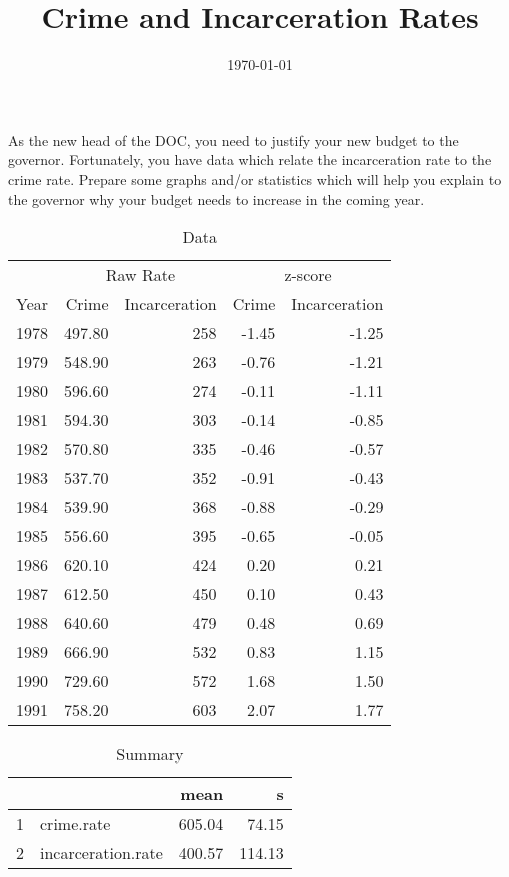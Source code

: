 \documentclass{exam}
\author{}
\title{Crime and Incarceration Rates}
\date{\today}
\begin{document}
  \maketitle

  As the new head of the DOC, you need to justify your new budget to the
  governor.  Fortunately, you have data which relate the incarceration rate to
  the crime rate.  Prepare some graphs and/or statistics which will help you
  explain to the governor why your budget needs to increase in the coming year.

  \begin{table}[H]
    \centering
    \begin{tabular}{rrrrr}
      \toprule
      & \multicolumn{2}{c}{Raw Rate} & \multicolumn{2}{c}{z-score } \\
      \cmidrule(r){2-3} \cmidrule(r){4-5} 
      Year & Crime  & Incarceration & Crime & Incarceration \\
      \midrule
      1978 & 497.80 & 258           & -1.45 & -1.25 \\
      1979 & 548.90 & 263           & -0.76 & -1.21 \\
      1980 & 596.60 & 274           & -0.11 & -1.11 \\
      1981 & 594.30 & 303           & -0.14 & -0.85 \\
      1982 & 570.80 & 335           & -0.46 & -0.57 \\
      1983 & 537.70 & 352           & -0.91 & -0.43 \\
      1984 & 539.90 & 368           & -0.88 & -0.29 \\
      1985 & 556.60 & 395           & -0.65 & -0.05 \\
      1986 & 620.10 & 424           & 0.20  & 0.21 \\
      1987 & 612.50 & 450           & 0.10  & 0.43 \\
      1988 & 640.60 & 479           & 0.48  & 0.69 \\
      1989 & 666.90 & 532           & 0.83  & 1.15 \\
      1990 & 729.60 & 572           & 1.68  & 1.50 \\
      1991 & 758.20 & 603           & 2.07  & 1.77 \\
      \bottomrule
    \end{tabular}
    \caption{Data}
  \end{table}

  \begin{table}[ht]
    \centering
    \begin{tabular}{rlrr}
      \toprule
        &                    & mean   & s \\
      \midrule
      1 & crime.rate         & 605.04 & 74.15 \\
      2 & incarceration.rate & 400.57 & 114.13 \\
      \bottomrule
    \end{tabular}
    \caption{Summary}
  \end{table}
\end{document}

